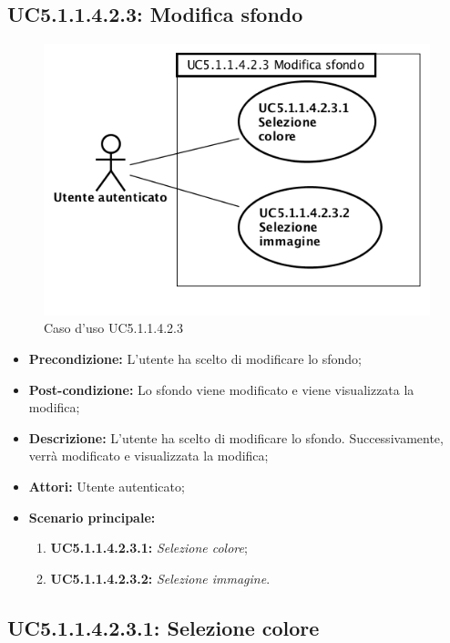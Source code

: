 \subsection{ UC5.1.1.4.2.3: Modifica sfondo}

\begin{figure}[h]
	\begin{center}
	\includegraphics[scale=0.4]{diagram/UC5-1-1-4-2-3.png}
	\caption{Caso d'uso UC5.1.1.4.2.3}
	\end{center}
\end{figure}
\begin{itemize}
	\item \textbf{Precondizione:} L'utente ha scelto di modificare lo sfondo;
	\item \textbf{Post-condizione:} Lo sfondo viene modificato e viene visualizzata la modifica;
	\item \textbf{Descrizione:} L'utente ha scelto di modificare lo sfondo.  Successivamente, verrà modificato e visualizzata la modifica;
	\item \textbf{Attori:} Utente autenticato;
	\item \textbf{Scenario principale:}
	\begin{enumerate}
		\item \textbf{ UC5.1.1.4.2.3.1:} \textit{ Selezione colore};
		\item \textbf{ UC5.1.1.4.2.3.2:} \textit{ Selezione immagine}.
	\end{enumerate}
\end{itemize}
\subsection{ UC5.1.1.4.2.3.1: Selezione colore}

